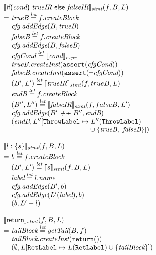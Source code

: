 \[\begin{array}{l@{}l@{~}l}
\lefteqn{\transfun{\irifelse{\emph{cond}}{\emph{trueIR}}{\emph{falseIR}}}_{\emph{stmt}}(f, B, L)}\\
& = & \emph{trueB} \letval f.\emph{createBlock}\\
& & \emph{cfg}.\emph{addEdge}(B, \emph{trueB})\\
& & \emph{falseB} \letval f.\emph{createBlock}\\
& & \emph{cfg}.\emph{addEdge}(B, \emph{falseB})\\
& & \emph{cfgCond} \letval \transfun{\emph{cond}}_{\emph{expr}}\\
& & \emph{trueB}.\emph{createInst}(\TT{assert}(\emph{cfgCond}))\\
& & \emph{falseB}.\emph{createInst}(\TT{assert}(\neg \emph{cfgCond}))\\
& & (B', L') \letval \transfun{\emph{trueIR}}_{\emph{stmt}}(f, trueB, L)\\
& & \emph{endB} \letval f.\emph{createBlock}\\
& & (B'', L'') \letval \transfun{\emph{falseIR}}_{\emph{stmt}}(f, falseB, L')\\
& & \emph{cfg}.\emph{addEdge}(B' ~\emph{++}~ B'', \emph{endB})\\
& & (\emph{endB}, L''[\ThrowLabel \mapsto L''(\ThrowLabel)\\
& & \phantom{(\emph{endB}, L''[\ThrowLabel \mapsto}
\cup \{ \emph{trueB},\ \emph{falseB} \}])\\
& & \\

\lefteqn{\transfun{\irlabel{l}{s}}_{\emph{stmt}}(f, B, L)}\\
& = & b \letval f.\emph{createBlock}\\
& & (B', L') \letval \transfun{s}_{\emph{stmt}}(f, B, L)\\
& & \emph{label} \letval l.\emph{name}\\
& & \emph{cfg}.\emph{addEdge}(B', b)\\
& & \emph{cfg}.\emph{addEdge}(L'(\emph{label}), b)\\
& & (b, L' - l)\\
& & \\

\lefteqn{\transfun{\mbox{\sf return}}_{\emph{stmt}}(f, B, L)}\\
& = & \emph{tailBlock} \letval \getTail(B, f)\\
& & \emph{tailBlock}.\emph{createInst}(\TT{return}())\\
& & (\emptyset, L[\RetLabel \mapsto L(\RetLabel) \cup \{ \emph{tailBlock}\}])\\
& & \\


\end{array}\]
